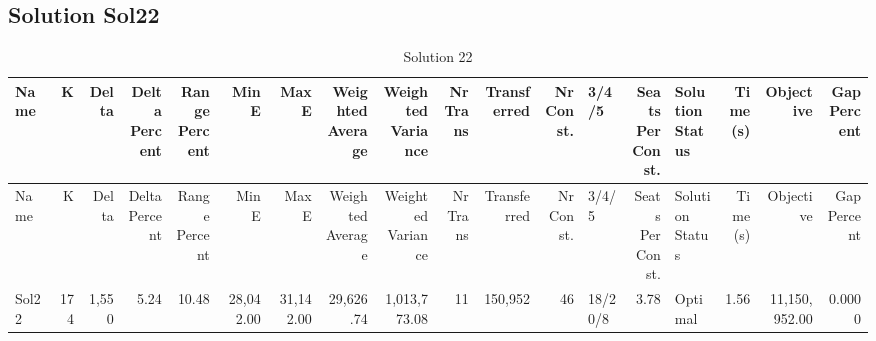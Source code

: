 \documentclass[a4paper]{article}
\begin{document}
\clearpage
\subsection{Solution Sol22}

{\scriptsize
\begin{longtable}{lrrrrrrrrrrrlrlrrr}
\caption{Solution 22}
\\ \toprule
Name &K &Delta &\shortstack{Delta\\Percent} &\shortstack{Range\\Percent} &Min E &Max E &\shortstack{Weighted\\Average} &\shortstack{Weighted\\Variance} &\shortstack{Nr\\Trans} &Transferred &\shortstack{Nr\\Const.} &3/4/5 &\shortstack{Seats\\Per\\Const.} &\shortstack{Solution\\Status} &\shortstack{Time\\(s)} &Objective &\shortstack{Gap\\Percent} \\ \midrule
\endfirsthead
\toprule
Name &K &Delta &\shortstack{Delta\\Percent} &\shortstack{Range\\Percent} &Min E &Max E &\shortstack{Weighted\\Average} &\shortstack{Weighted\\Variance} &\shortstack{Nr\\Trans} &Transferred &\shortstack{Nr\\Const.} &3/4/5 &\shortstack{Seats\\Per\\Const.} &\shortstack{Solution\\Status} &\shortstack{Time\\(s)} &Objective &\shortstack{Gap\\Percent} \\ \midrule
\endhead
\bottomrule
\endfoot
Sol22&174&1,550& 5.24&10.48&28,042.00&31,142.00&29,626.74&1,013,773.08&11&150,952&46&18/20/8& 3.78&Optimal& 1.56&11,150,952.00&0.0000\\ 
\end{longtable}

}
\end{document}
